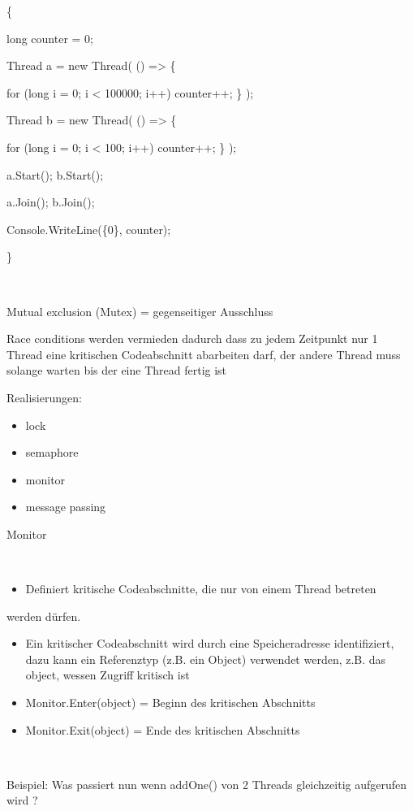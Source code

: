  \{

 long counter = 0;

 Thread a = new Thread( () ={\textgreater}  \{

 for (long i = 0; i {\textless} 100000; i++) counter++;  \} );

 Thread b = new Thread( () ={\textgreater}  \{

 for (long i = 0; i {\textless} 100; i++) counter++;  \} );

 a.Start(); b.Start();

 a.Join(); b.Join();

 Console.WriteLine({\textquotedbl}\{0\}{\textquotedbl}, counter);

 \}

~

Mutual exclusion (Mutex) = gegenseitiger Ausschluss

Race conditions werden vermieden dadurch dass zu jedem Zeitpunkt nur 1 Thread eine kritischen Codeabschnitt abarbeiten darf, der andere Thread muss solange warten bis der eine Thread fertig ist

Realisierungen:

\begin{itemize}
\item lock
\item semaphore
\item monitor
\item message passing
\end{itemize}
Monitor

~

\begin{itemize}
\item Definiert kritische Codeabschnitte, die nur von einem Thread betreten 
\end{itemize}
werden dürfen. 

\begin{itemize}
\item Ein kritischer Codeabschnitt wird durch eine Speicheradresse identifiziert, dazu kann ein Referenztyp (z.B. ein Object) verwendet werden, z.B. das object, wessen Zugriff kritisch ist
\item Monitor.Enter(object) = Beginn des kritischen Abschnitts 
\item Monitor.Exit(object)  = Ende des kritischen Abschnitts 
\end{itemize}
~

Beispiel: Was passiert nun wenn addOne() von 2 Threads gleichzeitig aufgerufen wird ? 

